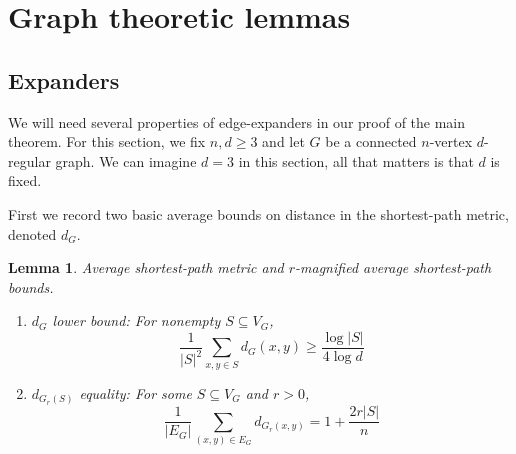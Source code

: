\documentclass[10pt]{article}
\newtheorem{lemma}[theorem]{Lemma}
\theoremstyle{definition}
\theoremstyle{definition}
\theoremstyle{definition}
\theoremstyle{definition}
\begin{document}
\section{Graph theoretic lemmas}

\subsection{Expanders}

We will need several properties of edge-expanders in our proof of the main theorem. 
For this section, we fix $n, d \geq 3$ and let $G$ be a connected $n$-vertex $d$-regular graph.
We can imagine $d = 3$ in this section, all that matters is that $d$ is fixed. 

First we record two basic average bounds on distance in the shortest-path metric, denoted $d_G$.
\begin{lemma} Average shortest-path metric and $r$-magnified average shortest-path bounds. \\
\begin{enumerate}

\item $d_G$ lower bound: For nonempty $S \subseteq V_G$,
\[
\frac{1}{|S|^2}\sum_{x, y \in S}d_G(x, y) \geq \frac{\log |S|}{4\log d}
\]

\item $d_{G_r(S)}$ equality: For some $S \subseteq V_G$ and $r > 0$, 
\[
\frac{1}{|E_G|}\sum_{(x, y ) \in E_G} d_{G_r(x, y)} = 1 + \frac{2r|S|}{n}
\]

\end{enumerate}
\end{lemma}
\end{document}
